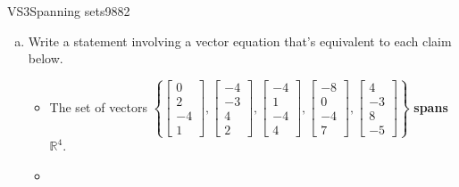 \begin{exercise}{VS3}{Spanning sets}{9882} 
\begin{exerciseStatement} 

\begin{enumerate}[(a)]
\item  

 Write a statement involving a vector equation that's equivalent to each claim below. 

 

\begin{itemize}
\item  

 The set of vectors \(\left\{ \left[\begin{array}{c}
0 \\
2 \\
-4 \\
1
\end{array}\right] , \left[\begin{array}{c}
-4 \\
-3 \\
4 \\
2
\end{array}\right] , \left[\begin{array}{c}
-4 \\
1 \\
-4 \\
4
\end{array}\right] , \left[\begin{array}{c}
-8 \\
0 \\
-4 \\
7
\end{array}\right] , \left[\begin{array}{c}
4 \\
-3 \\
8 \\
-5
\end{array}\right] \right\}\) \textbf{spans} \(\mathbb R^4\). 

 
\item  


\end{itemize}
\end{enumerate}
\end{exerciseStatement}
\end{exercise}
